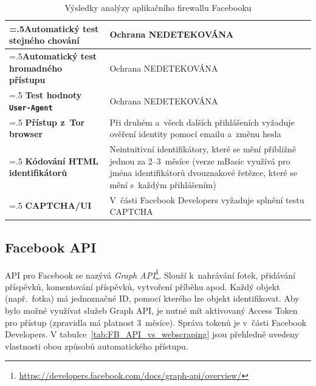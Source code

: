 \begin{table}[H]
\begin{tabularx}{\linewidth}{
  |>{\raggedright\arraybackslash\hsize=.5\hsize}X|>{\hsize=1.5\hsize}X|
  }
\hline
\textbf{Automatický test stejného chování} & Ochrana NEDETEKOVÁNA \\
\hline
\textbf{Automatický test hromadného přístupu} & Ochrana NEDETEKOVÁNA \\
\hline
\textbf{Test hodnoty \texttt{User-Agent}} & Ochrana NEDETEKOVÁNA \\
\hline
\textbf{Přístup z~Tor browser} & Při druhém a~všech dalších přihlášeních vyžaduje ověření identity pomocí emailu a~změnu hesla \\
\hline
\textbf{Kódování HTML identifikátorů} & Neintuitivní identifikátory, které se mění přibližně jednou za 2--3~měsíce (verze mBasic využívá pro jména identifikátorů dvouznakové řetězce, které se mění s~každým přihlášením)\\
\hline
\textbf{CAPTCHA/UI} & V~části Facebook Developers vyžaduje splnění testu CAPTCHA \\
\hline
\end{tabularx}

\caption{Výsledky analýzy aplikačního firewallu Facebooku}
\label{tab:FB_analyse}
\end{table}

\subsection*{Facebook API}
API pro Facebook se nazývá \textit{Graph API}\footnote{\href{https://developers.facebook.com/docs/graph-api/overview/}{https://developers.facebook.com/docs/graph-api/overview/}}. Slouží k~nahrávání fotek, přidávání příspěvků, komentování příspěvků, vytvoření příběhu apod. Každý objekt (např.~fotka) má jednoznačné ID, pomocí kterého lze objekt identifikovat. Aby bylo možné využívat služeb Graph API, je nutné mít aktivovaný Access Token pro přístup (zpravidla má platnost 3~měsíce). Správa tokenů je v~části Facebook Developers.
V tabulce~\ref{tab:FB_API_vs_webscraping} jsou přehledně uvedeny vlastnosti obou způsobů automatického přístupu.

